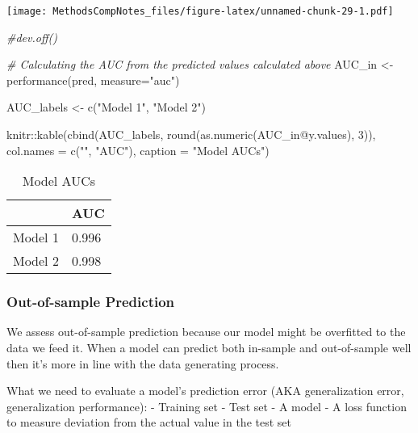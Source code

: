 \documentclass[
]{article}
\newenvironment{Shaded}{\begin{snugshade}}{\end{snugshade}}
\newcommand{\AttributeTok}[1]{\textcolor[rgb]{0.77,0.63,0.00}{#1}}
\newcommand{\CommentTok}[1]{\textcolor[rgb]{0.56,0.35,0.01}{\textit{#1}}}
\newcommand{\DecValTok}[1]{\textcolor[rgb]{0.00,0.00,0.81}{#1}}
\newcommand{\FunctionTok}[1]{\textcolor[rgb]{0.00,0.00,0.00}{#1}}
\newcommand{\NormalTok}[1]{#1}
\newcommand{\OtherTok}[1]{\textcolor[rgb]{0.56,0.35,0.01}{#1}}
\newcommand{\SpecialCharTok}[1]{\textcolor[rgb]{0.00,0.00,0.00}{#1}}
\newcommand{\StringTok}[1]{\textcolor[rgb]{0.31,0.60,0.02}{#1}}
\begin{document}
\texttt{[image: MethodsCompNotes\_files/figure-latex/unnamed-chunk-29-1.pdf]}

\begin{Shaded}
\begin{Highlighting}[]
\CommentTok{\#dev.off()}

\CommentTok{\# Calculating the AUC from the predicted values calculated above}
\NormalTok{AUC\_in }\OtherTok{\textless{}{-}} \FunctionTok{performance}\NormalTok{(pred, }\AttributeTok{measure=}\StringTok{"auc"}\NormalTok{)}

\NormalTok{AUC\_labels }\OtherTok{\textless{}{-}} \FunctionTok{c}\NormalTok{(}\StringTok{"Model 1"}\NormalTok{, }\StringTok{"Model 2"}\NormalTok{)}

\NormalTok{knitr}\SpecialCharTok{::}\FunctionTok{kable}\NormalTok{(}\FunctionTok{cbind}\NormalTok{(AUC\_labels, }\FunctionTok{round}\NormalTok{(}\FunctionTok{as.numeric}\NormalTok{(AUC\_in}\SpecialCharTok{@}\NormalTok{y.values), }\DecValTok{3}\NormalTok{)), }\AttributeTok{col.names =} \FunctionTok{c}\NormalTok{(}\StringTok{""}\NormalTok{, }\StringTok{"AUC"}\NormalTok{),}
      \AttributeTok{caption =} \StringTok{"Model AUCs"}\NormalTok{)}
\end{Highlighting}
\end{Shaded}

\begin{table}

\caption{\label{tab:unnamed-chunk-29}Model AUCs}
\centering
\begin{tabular}[t]{l|l}
\hline
 & AUC\\
\hline
Model 1 & 0.996\\
\hline
Model 2 & 0.998\\
\hline
\end{tabular}
\end{table}

\hypertarget{out-of-sample-prediction}{%
\subsubsection{Out-of-sample
Prediction}\label{out-of-sample-prediction}}

We assess out-of-sample prediction because our model might be overfitted
to the data we feed it. When a model can predict both in-sample and
out-of-sample well then it's more in line with the data generating
process.

What we need to evaluate a model's prediction error (AKA generalization
error, generalization performance): - Training set - Test set - A model
- A loss function to measure deviation from the actual value in the test
set
\end{document}
